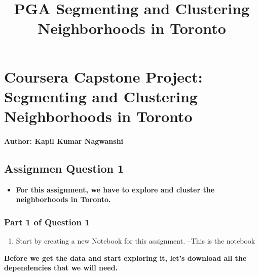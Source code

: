 \documentclass[11pt]{article}
\title{PGA Segmenting and Clustering Neighborhoods in Toronto}
\providecommand{\tightlist}{%
      \setlength{\itemsep}{0pt}\setlength{\parskip}{0pt}}
\begin{document}
    
    \maketitle
    
    

    
    \hypertarget{coursera-capstone-project-segmenting-and-clustering-neighborhoods-in-toronto}{%
\section{Coursera Capstone Project: Segmenting and Clustering
Neighborhoods in
Toronto}\label{coursera-capstone-project-segmenting-and-clustering-neighborhoods-in-toronto}}

\hypertarget{author-kapil-kumar-nagwanshi}{%
\paragraph{Author: Kapil Kumar
Nagwanshi}\label{author-kapil-kumar-nagwanshi}}

\hypertarget{assignmen-question-1}{%
\subsection{Assignmen Question 1}\label{assignmen-question-1}}

\begin{itemize}
\tightlist
\item
  \textbf{For this assignment, we have to explore and cluster the
  neighborhoods in Toronto.}
\end{itemize}

    \hypertarget{part-1-of-question-1}{%
\subsubsection{Part 1 of Question 1}\label{part-1-of-question-1}}

\begin{enumerate}
\def\labelenumi{\arabic{enumi}.}
\tightlist
\item
  Start by creating a new Notebook for this assignment. --This is the
  notebook
\end{enumerate}

\textbf{Before we get the data and start exploring it, let's download
all the dependencies that we will need.}
\end{document}
